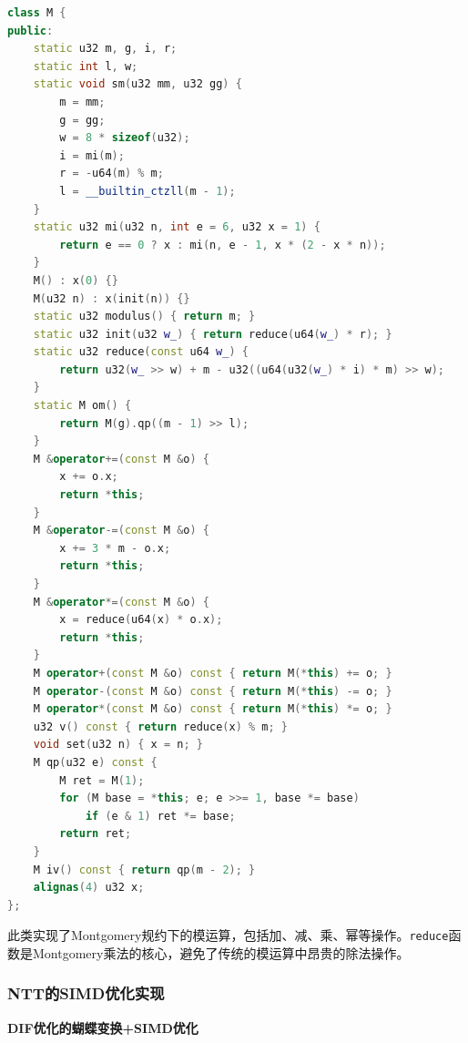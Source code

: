 \documentclass[a4paper,colorlinks=true,linkcolor=blue,urlcolor=blue,citecolor=green,bookmarks=true]{article}
\begin{document}
\begin{lstlisting}[language=C++]
class M {
public:
    static u32 m, g, i, r;
    static int l, w;
    static void sm(u32 mm, u32 gg) {
        m = mm;
        g = gg;
        w = 8 * sizeof(u32);
        i = mi(m);
        r = -u64(m) % m;
        l = __builtin_ctzll(m - 1);
    }
    static u32 mi(u32 n, int e = 6, u32 x = 1) {
        return e == 0 ? x : mi(n, e - 1, x * (2 - x * n));
    }
    M() : x(0) {}
    M(u32 n) : x(init(n)) {}
    static u32 modulus() { return m; }
    static u32 init(u32 w_) { return reduce(u64(w_) * r); }
    static u32 reduce(const u64 w_) {
        return u32(w_ >> w) + m - u32((u64(u32(w_) * i) * m) >> w);
    }
    static M om() {
        return M(g).qp((m - 1) >> l);
    }
    M &operator+=(const M &o) {
        x += o.x;
        return *this;
    }
    M &operator-=(const M &o) {
        x += 3 * m - o.x;
        return *this;
    }
    M &operator*=(const M &o) {
        x = reduce(u64(x) * o.x);
        return *this;
    }
    M operator+(const M &o) const { return M(*this) += o; }
    M operator-(const M &o) const { return M(*this) -= o; }
    M operator*(const M &o) const { return M(*this) *= o; }
    u32 v() const { return reduce(x) % m; }
    void set(u32 n) { x = n; }
    M qp(u32 e) const {
        M ret = M(1);
        for (M base = *this; e; e >>= 1, base *= base)
            if (e & 1) ret *= base;
        return ret;
    }
    M iv() const { return qp(m - 2); }
    alignas(4) u32 x;
};
\end{lstlisting}

此类实现了Montgomery规约下的模运算，包括加、减、乘、幂等操作。\verb|reduce|函数是Montgomery乘法的核心，避免了传统的模运算中昂贵的除法操作。

\subsubsection{NTT的SIMD优化实现}

\textbf{DIF优化的蝴蝶变换+SIMD优化}
\end{document}

